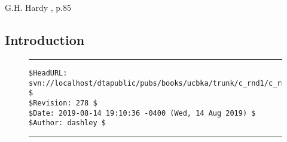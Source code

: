 
\chapter{\crndonelongtitle{}}

\label{crnd1}

                   {G.H. Hardy \cite{bibref:b:mathematiciansapology:1940},
                   p.85}

\section{Introduction}



\noindent\begin{figure}[!b]
\noindent\rule[-0.25in]{\textwidth}{1pt}
\begin{tiny}
\begin{verbatim}
$HeadURL: svn://localhost/dtapublic/pubs/books/ucbka/trunk/c_rnd1/c_rnd1.tex $
$Revision: 278 $
$Date: 2019-08-14 19:10:36 -0400 (Wed, 14 Aug 2019) $
$Author: dashley $
\end{verbatim}
\end{tiny}
\noindent\rule[0.25in]{\textwidth}{1pt}
\end{figure}
%
